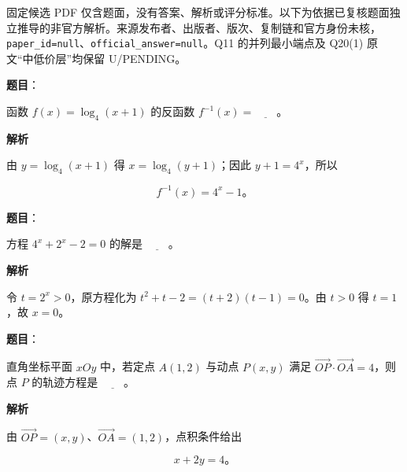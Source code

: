 

\begin{gktip}
固定候选 PDF 仅含题面，没有答案、解析或评分标准。以下为依据已复核题面独立推导的非官方解析。来源发布者、出版者、版次、复制链和官方身份未核，\texttt{paper_id=null}、\texttt{official_answer=null}。Q11 的并列最小端点及 Q20(1) 原文“中低价层”均保留 U/PENDING。
\end{gktip}

\begin{answer}

\textbf{题目}：

函数 $f(x)=\log_4(x+1)$ 的反函数 $f^{-1}(x)=\underline{\qquad}$。

\textbf{解析}

由 $y=\log_4(x+1)$ 得 $x=\log_4(y+1)$；因此 $y+1=4^x$，所以

\nopagebreak[4]
\[
f^{-1}(x)=4^x-1\mbox{。}
\]


\end{answer}
\begin{answer}

\textbf{题目}：

方程 $4^x+2^x-2=0$ 的解是 $\underline{\qquad}$。

\textbf{解析}

令 $t=2^x>0$，原方程化为 $t^2+t-2=(t+2)(t-1)=0$。由 $t>0$ 得 $t=1$，故 $x=0$。


\end{answer}
\begin{answer}

\textbf{题目}：

直角坐标平面 $xOy$ 中，若定点 $A(1,2)$ 与动点 $P(x,y)$ 满足 $\overrightarrow{OP}\cdot\overrightarrow{OA}=4$，则点 $P$ 的轨迹方程是 $\underline{\qquad}$。

\textbf{解析}

由 $\overrightarrow{OP}=(x,y)$、$\overrightarrow{OA}=(1,2)$，点积条件给出

\nopagebreak[4]
\[
x+2y=4\mbox{。}
\]


\end{answer}
